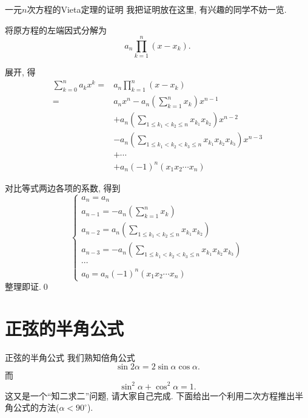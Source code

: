 \documentclass[serif]{beamer}
\begin{document}
\begin{frame}{\kaishu\normalsize *一元$n$次方程的Vieta定理的证明}
	我把证明放在这里, 有兴趣的同学不妨一览.\par
	{\fangsong
		将原方程的左端因式分解为
		\[a_n\prod\limits_{k=1}^{n}(x-x_k).\]
	}
	
\end{frame}

\begin{frame}
	\fangsong
	展开, 得
	\begin{align*}
		\sum\limits_{k=0}^{n}a_kx^k
		=&a_n\prod\limits_{k=1}^{n}(x-x_k)\\
		=&a_nx^n
		-a_n\left(\sum\limits_{k=1}^{n}x_k\right)x^{n-1}\\
		&+a_n\left(\sum\limits_{1\le k_1<k_2\le n}x_{k_1}x_{k_2}\right)x^{n-2}\\
		&-a_n\left(\sum\limits_{1\le k_1<k_2<k_3\le n}x_{k_1}x_{k_2}x_{k_3}\right)x^{n-3}\\
		&+\cdots\\
		&+a_n(-1)^n(x_1x_2\cdots x_n)
	\end{align*}
\end{frame}

\begin{frame}
	\fangsong
	对比等式两边各项的系数, 得到
	\[\begin{cases}
		a_n=a_n\\
		a_{n-1}=-a_n\left(\sum\limits_{k=1}^{n}x_k\right)\\
		a_{n-2}=a_n\left(\sum\limits_{1\le k_1<k_2\le n}x_{k_1}x_{k_2}\right)\\
		a_{n-3}=-a_n\left(\sum\limits_{1\le k_1<k_2<k_3\le n}x_{k_1}x_{k_2}x_{k_3}\right)\\
		\cdots\\
		a_0=a_n(-1)^n(x_1x_2\cdots x_n)
	\end{cases}\]
	整理即证.\hspace{\fill}\qed
\end{frame}

\section{\heiti 正弦的半角公式}

\begin{frame}{\heiti 正弦的半角公式}
	我们熟知倍角公式
	\[\sin2\alpha=2\sin\alpha\cos\alpha.\]
	而
	\[\sin^2\alpha+\cos^2\alpha=1.\]
	这又是一个“知二求二”问题, 请大家自己完成. 下面给出一个利用二次方程推出半角公式的方法($\alpha<90^\circ$).
\end{frame}
\end{document}
